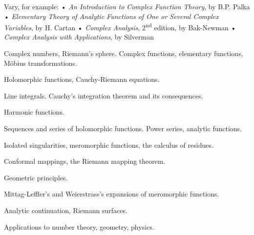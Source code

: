 \documentclass{osucourse}
\begin{document}
\CatalogDescription
\PrerequisitesAndExclusions

\begin{Text}
Vary, for example: • \emph{An Introduction to Complex Function Theory}, by B.P. Palka • \emph{Elementary Theory of Analytic Functions of One or Several Complex Variables}, by H. Cartan • \emph{Complex Analysis}, 2\textsuperscript{nd} edition, by Bak-Newman • \emph{Complex Analysis with Applications}, by Silverman
\end{Text}

\begin{TopicsList}
\item Complex numbers, Riemann's sphere. Complex functions, elementary functions, Möbius transformations.
\item Holomorphic functions, Cauchy-Riemann equations.
\item Line integrals. Cauchy’s integration theorem and its consequences.
\item Harmonic functions.
\item Sequences and series of holomorphic functions. Power series, analytic functions.
\item Isolated singularities, meromorphic functions, the calculus of residues.
\item Conformal mappings, the Riemann mapping theorem.
\item Geometric principles.
\item Mittag-Leffler's and Weierstrass's expansions of meromorphic functions.
\item Analytic continuation, Riemann surfaces.
\item Applications to number theory, geometry, physics.
\end{TopicsList}
\end{document}
